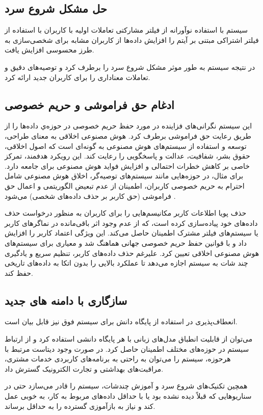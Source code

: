 \subsection{حل مشکل شروع سرد}
سیستم با استفاده نوآورانه از فیلتر مشارکتی تعاملات اولیه با کاربران با استفاده از فیلتر اشتراکی مبتنی بر آیتم را افزایش داده‌ها از کاربران مشابه برای شخصی‌سازی به طرز محسوسی افزایش یافت.

در نتیجه سیستم به طور موثر مشکل شروع سرد را برطرف کرد و توصیه‌های دقیق و تعاملات معناداری را برای کاربران جدید ارائه کرد.

\subsection{ادغام حق فراموشی و حریم خصوصی}
این سیستم نگرانی‌های فزاینده در مورد حفظ حریم خصوصی در حوزه‌ي داده‌ها را از طریق رعایت حق فراموشی برطرف کرد.
هوش مصنوعی اخلاقی به معنای طراحی، توسعه و استفاده از سیستم‌های هوش مصنوعی به گونه‌ای است که اصول اخلاقی، حقوق بشر، شفافیت، عدالت و پاسخگویی را رعایت کند. این رویکرد هدفمند، تمرکز خاصی بر کاهش خطرات احتمالی و افزایش فواید هوش مصنوعی برای جامعه دارد. برای مثال، در حوزه‌هایی مانند سیستم‌های توصیه‌گر، اخلاق هوش مصنوعی شامل احترام به حریم خصوصی کاربران، اطمینان از عدم تبعیض الگوریتمی و اعمال حق فراموشی (حق کاربر بر حذف داده‌های شخصی) می‌شود %
\cite{camilleri2024artificial}
.

 حذف پویا اطلاعات کاربر مکانیسم‌هایی را برای کاربران به منظور درخواست حذف داده‌های خود پیاده‌سازی کرده است، که از عدم وجود اثر باقی‌مانده در نماگر‌های کاربر یا سیستم‌های فیلتر مشترک اطمینان حاصل می‌کند. این ویژگی اعتماد کاربر را افزایش داد و با قوانین حفظ حریم خصوصی جهانی هماهنگ شد و معیاری برای سیستم‌های هوش مصنوعی اخلاقی تعیین کرد. علیرغم حذف داده‌های کاربر، تنظیم سریع و یادگیری چند شات به سیستم اجازه می‌دهد تا عملکرد بالایی را بدون اتکا به داده‌های تاریخی حفظ کند.

\subsection{سازگاری با دامنه های جدید}

 انعطاف‌پذیری در استفاده از پایگاه دانش برای سیستم فوق نیز قابل بیان است.

 می‌توان از قابلیت انطباق مدل‌های زبانی با هر پایگاه دانشی استفاده کرد و از ارتباط سیستم در حوزه‌های مختلف اطمینان حاصل کرد. در صورت وجود دیتاست‌ مرتبط با هرحوزه، سیستم را می‌توان به راحتی به برنامه‌های کاربردی خدمات مشتری، مراقبت‌های بهداشتی و تجارت الکترونیک گسترش داد.

همچین تکنیک‌های شروع سرد و آموزش چندشات، سیستم را قادر می‌سازد حتی در سناریوهایی که قبلاً دیده نشده بود یا با حداقل داده‌های مربوط به کار، به خوبی عمل کند و نیاز به بازآموزی گسترده را به حداقل برساند.

